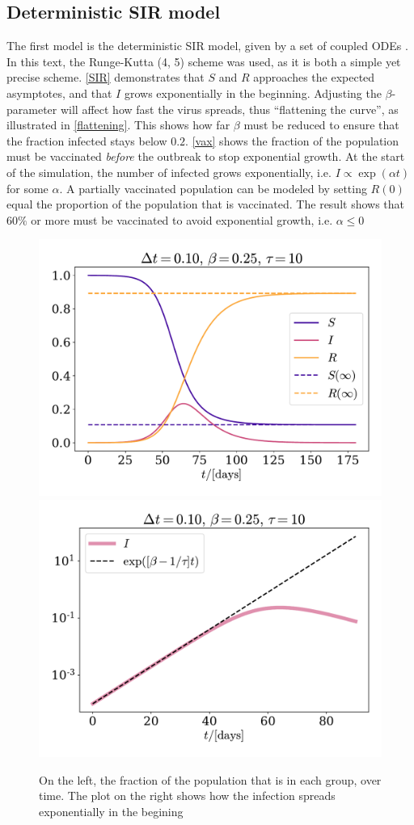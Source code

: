 \documentclass{article}
\begin{document}
    \subsection*{Deterministic SIR model}
    The first model is the deterministic SIR model, given by a set of coupled ODEs \cite{exam}. 
    In this text, the Runge-Kutta (4, 5) scheme was used, as it is both a simple yet precise scheme.
    \autoref{SIR} demonstrates that $S$ and $R$ approaches the expected asymptotes, and that $I$ grows exponentially in the beginning. 
    Adjusting the $\beta$-parameter will affect how fast the virus spreads, thus ``flattening the curve'', as illustrated in \autoref{flattening}.
    This shows how far $\beta$ must be reduced to ensure that the fraction infected stays below $0.2$. 
    \autoref{vax} shows the fraction of the population must be vaccinated \emph{before} the outbreak to stop exponential growth. At the start of the simulation, the number of infected grows exponentially, i.e. $I \propto \exp(\alpha t)$ for some $\alpha$. A partially vaccinated population can be modeled by setting $R(0)$ equal the proportion of the population that is vaccinated. The result shows that $60\%$ or more must be vaccinated to avoid exponential growth, i.e. $\alpha\leq 0$ 

    \begin{figure}
        \centering
        \includegraphics[width=.49\textwidth]{../plots/2A/TestSIR}
        \includegraphics[width=.49\textwidth]{../plots/2A/TestI}
        \caption{On the left, the fraction of the population that is in each group, over time. The plot on the right shows how the infection spreads exponentially in the begining}
        \label{SIR}
    \end{figure}
\end{document}
